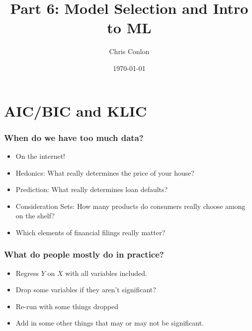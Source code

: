 \documentclass[xcolor=pdftex,dvipsnames,table,mathserif,aspectratio=169]{beamer}
\begin{document}
\title{Part 6: Model Selection and Intro to ML}
\author{Chris Conlon}
\date{\today}

\frame{\titlepage}
\section{AIC/BIC and KLIC}


\begin{frame}
\frametitle{When do we have too much data?}
\begin{itemize}
\item On the internet!
\item Hedonics: What really determines the price of your house?
\item Prediction: What really determines loan defaults?
\item Consideration Sets: How many products do consumers really choose among on the shelf?
\item Which elements of financial filings really matter?
\end{itemize}
\end{frame}


\begin{frame}
\frametitle{What do people mostly do in practice?}
\begin{itemize}
\item Regress $Y$ on $X$ with all variables included.
\item Drop some variables if they aren't significant?
\item Re-run with some things dropped
\item Add in some other things that may or may not be significant.
\end{itemize}
\end{frame}
\end{document}
